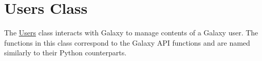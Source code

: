 \hypertarget{group__users__class}{}\section{Users Class}
\label{group__users__class}
The \hyperlink{classUsers}{Users} class interacts with Galaxy to manage contents of a Galaxy user. The functions in this class correspond to the Galaxy A\+PI functions and are named similarly to their Python counterparts. 